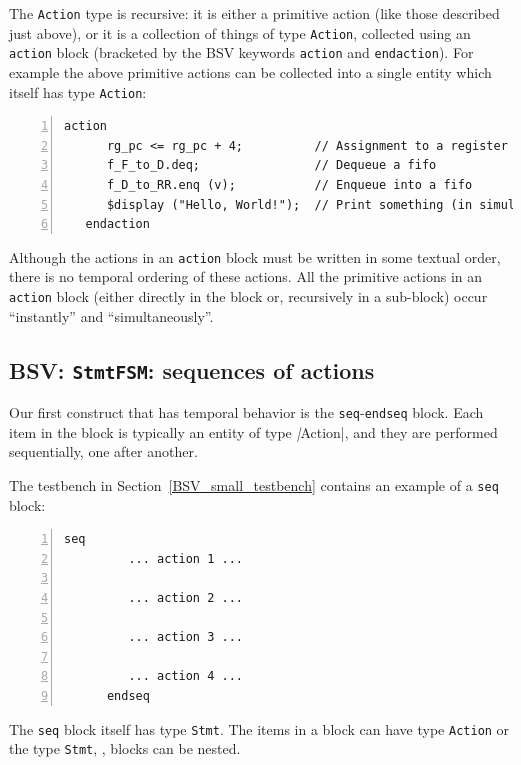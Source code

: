The \verb|Action| type is recursive: it is either a primitive action
(like those described just above), or it is a collection of things of
type \verb|Action|, collected using an \verb|action| block (bracketed
by the BSV keywords \verb|action| and \verb|endaction|).  For example
the above primitive actions can be collected into a single entity
which itself has type \verb|Action|:

\begin{Verbatim}[frame=single, numbers=left]
   action
      rg_pc <= rg_pc + 4;          // Assignment to a register
      f_F_to_D.deq;                // Dequeue a fifo
      f_D_to_RR.enq (v);           // Enqueue into a fifo
      $display ("Hello, World!");  // Print something (in simulation only)
   endaction
\end{Verbatim}

Although the actions in an \verb|action| block must be written in some
textual order, there is no temporal ordering of these actions.  All
the primitive actions in an \verb|action| block (either directly in
the block or, recursively in a sub-block) occur ``instantly'' and
``simultaneously''.


\subsection{BSV: {\tt StmtFSM}: sequences of actions}


Our first construct that has temporal behavior is the
\verb|seq|-\verb|endseq| block.  Each item in the block is typically
an entity of type \emph|Action|, and they are performed sequentially,
one after another.

The testbench in Section~\ref{BSV_small_testbench} contains an example
of a \verb|seq| block:
\begin{Verbatim}[frame=single, numbers=left]
      seq
         ... action 1 ...

         ... action 2 ...

         ... action 3 ...

         ... action 4 ...
      endseq
\end{Verbatim}


The \verb|seq| block itself has type \verb|Stmt|.  The items in a
block can have type \verb|Action| or the type \verb|Stmt|, {\ie},
blocks can be nested.

